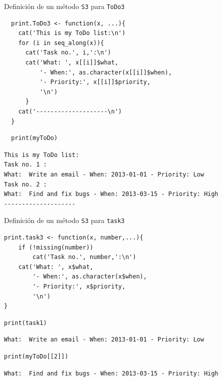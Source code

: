 \documentclass[xcolor={usenames,svgnames,dvipsnames}]{beamer}
\begin{document}
\begin{frame}[fragile,label={sec:orgheadline12}]{Definición de un método \texttt{S3} para \texttt{ToDo3}}
 \lstset{language=R,label= ,caption= ,captionpos=b,numbers=none}
\begin{lstlisting}
  print.ToDo3 <- function(x, ...){
    cat('This is my ToDo list:\n')
    for (i in seq_along(x)){
      cat('Task no.', i,':\n')
      cat('What: ', x[[i]]$what,
          '- When:', as.character(x[[i]]$when),
          '- Priority:', x[[i]]$priority,
          '\n')
      }
    cat('--------------------\n')
  }
\end{lstlisting}

\lstset{language=R,label= ,caption= ,captionpos=b,numbers=none}
\begin{lstlisting}
  print(myToDo)
\end{lstlisting}

\begin{verbatim}
This is my ToDo list:
Task no. 1 :
What:  Write an email - When: 2013-01-01 - Priority: Low 
Task no. 2 :
What:  Find and fix bugs - When: 2013-03-15 - Priority: High 
--------------------
\end{verbatim}
\end{frame}

\begin{frame}[fragile,label={sec:orgheadline13}]{Definición de un método \texttt{S3} para \texttt{task3}}
 \lstset{language=R,label= ,caption= ,captionpos=b,numbers=none}
\begin{lstlisting}
print.task3 <- function(x, number,...){
    if (!missing(number))
        cat('Task no.', number,':\n')
    cat('What: ', x$what,
        '- When:', as.character(x$when),
        '- Priority:', x$priority,
        '\n')
}
\end{lstlisting}

\lstset{language=R,label= ,caption= ,captionpos=b,numbers=none}
\begin{lstlisting}
print(task1)
\end{lstlisting}

\begin{verbatim}
What:  Write an email - When: 2013-01-01 - Priority: Low
\end{verbatim}

\lstset{language=R,label= ,caption= ,captionpos=b,numbers=none}
\begin{lstlisting}
print(myToDo[[2]])
\end{lstlisting}

\begin{verbatim}
What:  Find and fix bugs - When: 2013-03-15 - Priority: High
\end{verbatim}
\end{frame}
\end{document}
